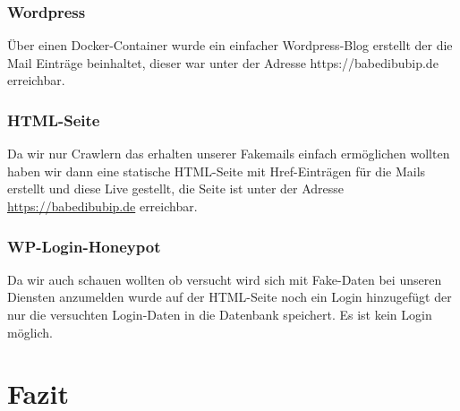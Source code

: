 \documentclass[a4paper,11pt,singlespacing]{article}
\begin{document}
		\subsubsection{Wordpress}\label{WebsiteWordpress}
			Über einen Docker-Container wurde ein einfacher Wordpress-Blog erstellt der die Mail Einträge beinhaltet, dieser war unter der Adresse https://babedibubip.de erreichbar.
			
		\subsubsection{HTML-Seite}\label{WebsiteHTML-Seite}
			Da wir nur Crawlern das erhalten unserer Fakemails einfach ermöglichen wollten haben wir dann eine statische HTML-Seite mit Href-Einträgen für die Mails erstellt und diese Live gestellt, die Seite ist unter der Adresse \url{https://babedibubip.de} erreichbar.

		\subsubsection{WP-Login-Honeypot}\label{WebsiteWP-Login-Honeypot}
			Da wir auch schauen wollten ob versucht wird sich mit Fake-Daten bei unseren Diensten anzumelden wurde auf der HTML-Seite noch ein Login hinzugefügt der nur die versuchten Login-Daten in die Datenbank speichert. Es ist kein Login möglich.

\newpage

	
\section{Fazit}\label{sec:Fazit}

\newpage




\newpage


\listoffigures
{}
\newpage
\end{document}
